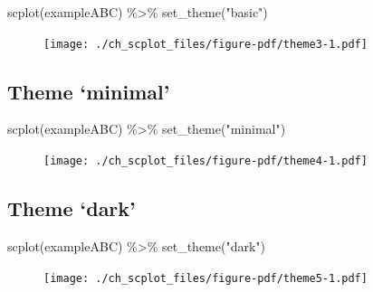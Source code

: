 \documentclass[
  letterpaper,
  DIV=11,
  numbers=noendperiod]{scrreprt}
\newenvironment{Shaded}{\begin{snugshade}}{\end{snugshade}}
\newcommand{\FunctionTok}[1]{\textcolor[rgb]{0.28,0.35,0.67}{#1}}
\newcommand{\NormalTok}[1]{\textcolor[rgb]{0.00,0.23,0.31}{#1}}
\newcommand{\SpecialCharTok}[1]{\textcolor[rgb]{0.37,0.37,0.37}{#1}}
\newcommand{\StringTok}[1]{\textcolor[rgb]{0.13,0.47,0.30}{#1}}
\begin{document}
\begin{Shaded}
\begin{Highlighting}[]
\FunctionTok{scplot}\NormalTok{(exampleABC) }\SpecialCharTok{\%\textgreater{}\%}
  \FunctionTok{set\_theme}\NormalTok{(}\StringTok{"basic"}\NormalTok{)}
\end{Highlighting}
\end{Shaded}

\begin{figure}[H]

{\centering \texttt{[image: ./ch\_scplot\_files/figure-pdf/theme3-1.pdf]}

}

\end{figure}

\hypertarget{theme-minimal}{%
\subsection{Theme `minimal'}\label{theme-minimal}}

\begin{Shaded}
\begin{Highlighting}[]
\FunctionTok{scplot}\NormalTok{(exampleABC) }\SpecialCharTok{\%\textgreater{}\%}
  \FunctionTok{set\_theme}\NormalTok{(}\StringTok{"minimal"}\NormalTok{)}
\end{Highlighting}
\end{Shaded}

\begin{figure}[H]

{\centering \texttt{[image: ./ch\_scplot\_files/figure-pdf/theme4-1.pdf]}

}

\end{figure}

\hypertarget{theme-dark}{%
\subsection{Theme `dark'}\label{theme-dark}}

\begin{Shaded}
\begin{Highlighting}[]
\FunctionTok{scplot}\NormalTok{(exampleABC) }\SpecialCharTok{\%\textgreater{}\%}
  \FunctionTok{set\_theme}\NormalTok{(}\StringTok{"dark"}\NormalTok{)}
\end{Highlighting}
\end{Shaded}

\begin{figure}[H]

{\centering \texttt{[image: ./ch\_scplot\_files/figure-pdf/theme5-1.pdf]}

}

\end{figure}
\end{document}
